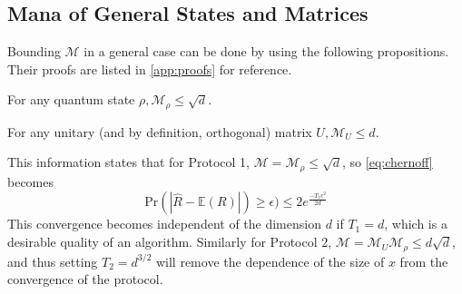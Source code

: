 \documentclass[../3Wworkreport.tex]{subfiles}
\begin{document}
\subsection{Mana of General States and Matrices}
\label{subsec:cr_general}
Bounding $\mathcal{M}$ in a general case can be done by using the following propositions. Their proofs are listed in \autoref{app:proofs} for reference.
\begin{prop}\label{prop:manarho}
	For any quantum state $\rho, \mathcal{M}_\rho \le \sqrt{d}$.
\end{prop}
\begin{prop}\label{prop:manaunitary}
	For any unitary (and by definition, orthogonal) matrix $U, \mathcal{M}_U \le d$.
\end{prop}
This information states that for Protocol 1, $\mathcal{M} = \mathcal{M}_\rho \le \sqrt{d}$, so \autoref{eq:chernoff} becomes
\begin{equation}
	\text{Pr}(|\hat{R} - \mathbb{E}(R)|) \ge \epsilon) \le 2e^{\frac{-T_1\epsilon^2}{2d}}
\end{equation}
This convergence becomes independent of the dimension $d$ if $T_1 = d$, which is a desirable quality of an algorithm. Similarly for Protocol 2, $\mathcal{M} = \mathcal{M}_U \mathcal{M}_\rho \le d\sqrt{d}$, and thus setting $T_2 = d^{3/2}$ will remove the dependence of the size of $x$ from the convergence of the protocol.
\end{document}
